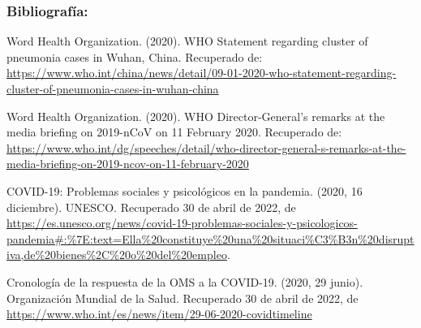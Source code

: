 \documentclass[
  12pt,
]{article}
\begin{document}
\hypertarget{bibliografuxeda}{%
\subsubsection{Bibliografía:}\label{bibliografuxeda}}

Word Health Organization. (2020). WHO Statement regarding cluster of
pneumonia cases in Wuhan, China. Recuperado de:
\url{https://www.who.int/china/news/detail/09-01-2020-who-statement-regarding-cluster-of-pneumonia-cases-in-wuhan-china}

Word Health Organization. (2020). WHO Director-General's remarks at the
media briefing on 2019-nCoV on 11 February 2020. Recuperado de:
\url{https://www.who.int/dg/speeches/detail/who-director-general-s-remarks-at-the-media-briefing-on-2019-ncov-on-11-february-2020}

COVID-19: Problemas sociales y psicológicos en la pandemia. (2020, 16
diciembre). UNESCO. Recuperado 30 de abril de 2022, de
\url{https://es.unesco.org/news/covid-19-problemas-sociales-y-psicologicos-pandemia\#:\%7E:text=Ella\%20constituye\%20una\%20situaci\%C3\%B3n\%20disruptiva,de\%20bienes\%2C\%20o\%20del\%20empleo}.

Cronología de la respuesta de la OMS a la COVID-19‎. (2020, 29 junio).
Organización Mundial de la Salud. Recuperado 30 de abril de 2022, de
\url{https://www.who.int/es/news/item/29-06-2020-covidtimeline}
\end{document}
